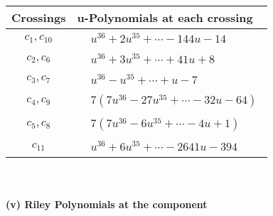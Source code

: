 \documentclass[1p]{elsarticle_modified}
\theoremstyle{definition}
\begin{document}
\begin{tabular}{m{50pt}|m{274pt}}
Crossings & \hspace{64pt}u-Polynomials at each crossing \\
\hline $$\begin{aligned}c_{1},c_{10}\end{aligned}$$&$\begin{aligned}
&u^{36}+2 u^{35}+\cdots-144 u-14
\end{aligned}$\\
\hline $$\begin{aligned}c_{2},c_{6}\end{aligned}$$&$\begin{aligned}
&u^{36}+3 u^{35}+\cdots+41 u+8
\end{aligned}$\\
\hline $$\begin{aligned}c_{3},c_{7}\end{aligned}$$&$\begin{aligned}
&u^{36}- u^{35}+\cdots+u-7
\end{aligned}$\\
\hline $$\begin{aligned}c_{4},c_{9}\end{aligned}$$&$\begin{aligned}
&7(7 u^{36}-27 u^{35}+\cdots-32 u-64)
\end{aligned}$\\
\hline $$\begin{aligned}c_{5},c_{8}\end{aligned}$$&$\begin{aligned}
&7(7 u^{36}-6 u^{35}+\cdots-4 u+1)
\end{aligned}$\\
\hline $$\begin{aligned}c_{11}\end{aligned}$$&$\begin{aligned}
&u^{36}+6 u^{35}+\cdots-2641 u-394
\end{aligned}$\\
\hline
\end{tabular}\\~\\
\newpage\renewcommand{\arraystretch}{1}
\flushleft \textbf{(v) Riley Polynomials at the component}\newline \\
\end{document}
